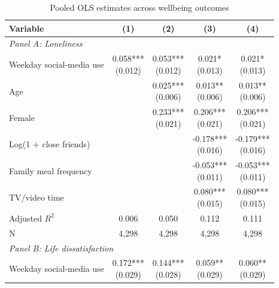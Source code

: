 \begin{table}[!htbp]
\centering
\caption{Pooled OLS estimates across wellbeing outcomes}
\label{tab:pooled_ols_benchmarks}
\scriptsize
\setlength{\tabcolsep}{4pt}
\renewcommand{\arraystretch}{0.88}
\begin{tabular}{lcccc}
\hline
Variable & (1) & (2) & (3) & (4) \\
\hline
\multicolumn{5}{l}{\textit{Panel A: Loneliness}} \\
\hline
Weekday social-media use & \shortstack[c]{0.058*** \\[-0.35ex] (0.012)} & \shortstack[c]{0.053*** \\[-0.35ex] (0.012)} & \shortstack[c]{0.021* \\[-0.35ex] (0.013)} & \shortstack[c]{0.021* \\[-0.35ex] (0.013)}
\\
Age &  & \shortstack[c]{0.025*** \\[-0.35ex] (0.006)} & \shortstack[c]{0.013** \\[-0.35ex] (0.006)} & \shortstack[c]{0.013** \\[-0.35ex] (0.006)}
\\
Female &  & \shortstack[c]{0.233*** \\[-0.35ex] (0.021)} & \shortstack[c]{0.206*** \\[-0.35ex] (0.021)} & \shortstack[c]{0.206*** \\[-0.35ex] (0.021)}
\\
Log(1 + close friends) &  &  & \shortstack[c]{-0.178*** \\[-0.35ex] (0.016)} & \shortstack[c]{-0.179*** \\[-0.35ex] (0.016)}
\\
Family meal frequency &  &  & \shortstack[c]{-0.053*** \\[-0.35ex] (0.011)} & \shortstack[c]{-0.053*** \\[-0.35ex] (0.011)}
\\
TV/video time &  &  & \shortstack[c]{0.080*** \\[-0.35ex] (0.015)} & \shortstack[c]{0.080*** \\[-0.35ex] (0.015)}
\\
\hline
Adjusted $R^2$ & 0.006 & 0.050 & 0.112 & 0.111
\\
N & 4,298 & 4,298 & 4,298 & 4,298
\\
\hline
\multicolumn{5}{l}{\textit{Panel B: Life dissatisfaction}} \\
\hline
Weekday social-media use & \shortstack[c]{0.172*** \\[-0.35ex] (0.029)} & \shortstack[c]{0.144*** \\[-0.35ex] (0.028)} & \shortstack[c]{0.059** \\[-0.35ex] (0.029)} & \shortstack[c]{0.060** \\[-0.35ex] (0.029)}

\end{tabular}
\end{table}
